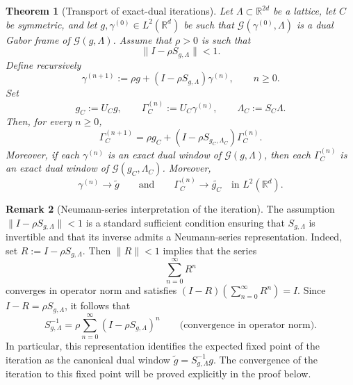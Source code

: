 \documentclass[final,1p,times,authoryear]{elsarticle}
\newtheorem{theorem}{Theorem}
\theoremstyle{definition}
\newtheorem{remark}[theorem]{Remark}
\newcommand{\R}{\mathbb{R}}
\newcommand{\1}{\mathbf{1}}
\begin{document}
\begin{theorem}[Transport of exact-dual iterations]\label{thm:iteration_transport}
Let $\Lambda\subset \R^{2d}$ be a lattice, let $C$ be symmetric, and let
$g,\gamma^{(0)}\in L^2(\R^d)$ be such that $\mathcal G(\gamma^{(0)},\Lambda)$ is a dual Gabor frame of
$\mathcal G(g,\Lambda)$.
Assume that $\rho>0$ is such that
$$
\|I-\rho S_{g,\Lambda}\|<1.
$$
Define recursively
$$
\gamma^{(n+1)}
:=
\rho g + (I-\rho S_{g,\Lambda})\gamma^{(n)},
\qquad n\geq 0.
$$
Set
$$
g_C:=U_C g,
\qquad
\Gamma_C^{(n)}:=U_C\gamma^{(n)},
\qquad
\Lambda_C:=S_C\Lambda.
$$
Then, for every $n\geq 0$,
$$
\Gamma_C^{(n+1)}
=
\rho g_C + (I-\rho S_{g_C,\Lambda_C})\Gamma_C^{(n)}.
$$
Moreover, if each $\gamma^{(n)}$ is an exact dual window of $\mathcal G(g,\Lambda)$, then each
$\Gamma_C^{(n)}$ is an exact dual window of $\mathcal G(g_C,\Lambda_C)$.
Moreover,
$$
\gamma^{(n)}\to \widetilde g
\qquad\text{and}\qquad
\Gamma_C^{(n)}\to \widetilde{g_C}
\quad\text{in }L^2(\R^d).
$$
\end{theorem}
\begin{remark}[Neumann-series interpretation of the iteration]\label{rem:neumann_series}
The assumption $\|I-\rho S_{g,\Lambda}\|<1$ is a standard sufficient condition ensuring that
$S_{g,\Lambda}$ is invertible and that its inverse admits a Neumann-series representation. Indeed,
set $R:=I-\rho S_{g,\Lambda}$. Then $\|R\|<1$ implies that the series
$$
\sum_{n=0}^\infty R^n
$$
converges in operator norm and satisfies $(I-R)\left(\sum_{n=0}^\infty R^n\right)=I$.
Since $I-R=\rho S_{g,\Lambda}$, it follows that
$$
S_{g,\Lambda}^{-1}=\rho\sum_{n=0}^\infty (I-\rho S_{g,\Lambda})^n
\qquad\text{(convergence in operator norm).}
$$
In particular, this representation identifies the expected fixed point of the iteration as the canonical
dual window $\widetilde g=S_{g,\Lambda}^{-1}g$. The convergence of the iteration to this fixed point will be
proved explicitly in the proof below.
\end{remark}
\end{document}
